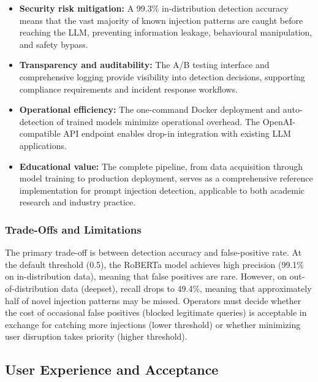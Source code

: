 \documentclass[12pt, letterpaper]{article}   %
\begin{document}
\begin{itemize}
    \item \textbf{Security risk mitigation:} A 99.3\% in-distribution detection accuracy means that the vast majority of known injection patterns are caught before reaching the LLM, preventing information leakage, behavioural manipulation, and safety bypass.

    \item \textbf{Transparency and auditability:} The A/B testing interface and comprehensive logging provide visibility into detection decisions, supporting compliance requirements and incident response workflows.

    \item \textbf{Operational efficiency:} The one-command Docker deployment and auto-detection of trained models minimize operational overhead. The OpenAI-compatible API endpoint enables drop-in integration with existing LLM applications.

    \item \textbf{Educational value:} The complete pipeline, from data acquisition through model training to production deployment, serves as a comprehensive reference implementation for prompt injection detection, applicable to both academic research and industry practice.
\end{itemize}

\subsubsection{Trade-Offs and Limitations}

The primary trade-off is between detection accuracy and false-positive rate. At the default threshold (0.5), the RoBERTa model achieves high precision (99.1\% on in-distribution data), meaning that false positives are rare. However, on out-of-distribution data (deepset), recall drops to 49.4\%, meaning that approximately half of novel injection patterns may be missed. Operators must decide whether the cost of occasional false positives (blocked legitimate queries) is acceptable in exchange for catching more injections (lower threshold) or whether minimizing user disruption takes priority (higher threshold).


\subsection{User Experience and Acceptance}
\end{document}
